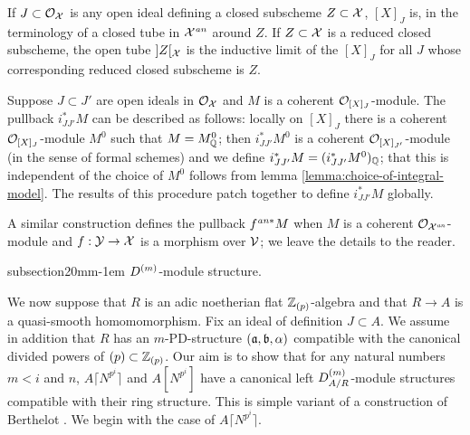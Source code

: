\documentclass{article}
\makeatletter
\theoremstyle{change}
\renewcommand{\subsection}{\@startsection%
{subsection}{2}{0mm}{\baselineskip}{-1em}%
{\normalfont\normalsize\bfseries}}
\numberwithin{equation}{subsubsection}
\newcommand\lc{\lceil}
\newcommand\rc{\rceil}
\makeatother
\begin{document}
If $J\subset{\cal O}_{\cal X}$ is any open ideal defining a closed subscheme
$Z\subset{\cal X}$, $[X]_J$ is, in the terminology of
\cite{berthelot:1996a} a closed tube in ${\cal X}^{\mathit{an}}$ around $Z$. If
$Z\subset{\cal X}$ is a reduced closed subscheme, the open tube $]Z[_{\cal X}$
is the inductive limit of the $[X]_J$ for all $J$ whose corresponding
reduced closed subscheme is $Z$.

Suppose $J\subset J'$ are open ideals in ${\cal O}_{\cal X}$ and $M$ is a
coherent ${\cal O}_{[X]_J}$-module. The pullback $i_{JJ'}^*M$ can be
described as follows: locally on $[X]_J$ there is a coherent
${\cal O}_{[X]_J}$-module $M^0$ such that $M=M^0_{\mathbb Q}$; then $i_{JJ'}^*M^0$
is a coherent ${\cal O}_{[X]_{J'}}$-module (in the sense of formal schemes)
and we define $i_{JJ'}^*M=(i_{JJ'}^*M^0)_{\mathbb Q}$; that this is
independent of the choice of $M^0$ follows from lemma
\ref{lemma:choice-of-integral-model}. The results of this procedure
patch together to define $i_{JJ'}^*M$ globally.

A similar construction defines the pullback $f^{\mathit{an}*}M$ when $M$ is a
coherent ${\cal O}_{{\cal X}^{\mathit{an}}}$-module and $f:{\cal Y}\to{\cal X}$ is a morphism over
${\cal V}$; we leave the details to the reader.

\subsection{${D}^{({m})}$-module structure.}
\label{sec:Dm-modules-on-tubes}

We now suppose that $R$ is an adic noetherian flat ${\mathbb Z}_{(p)}$-algebra
and that $R\to A$ is a quasi-smooth homomomorphism. Fix an ideal of
definition $J\subset A$. We assume in addition that $R$ has an
$m$-PD-structure $({\mathfrak a},{\mathfrak b},\alpha)$ compatible with the canonical
divided powers of $(p)\subset{\mathbb Z}_{(p)}$. Our aim is to show that for
any natural numbers $m<i$ and $n$, $A\lc N^{p^i}\rc$ and $A[N^{p^i}]$
have a canonical left ${D}^{({m})}_{A/R}$-module structures compatible
with their ring structure. This is simple variant of a construction
of Berthelot \cite[Prop. 4.2.1]{berthelot:1996}. We begin with the
case of $A \lc N^{p^i}\rc$.
\end{document}
